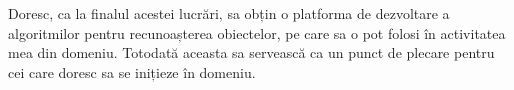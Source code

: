 Doresc, ca la finalul acestei lucrări, sa obțin o platforma de dezvoltare a algoritmilor pentru recunoașterea obiectelor, pe care sa o pot folosi în activitatea mea din domeniu.
Totodată aceasta sa servească ca un punct de plecare pentru cei care doresc sa se inițieze în domeniu.











